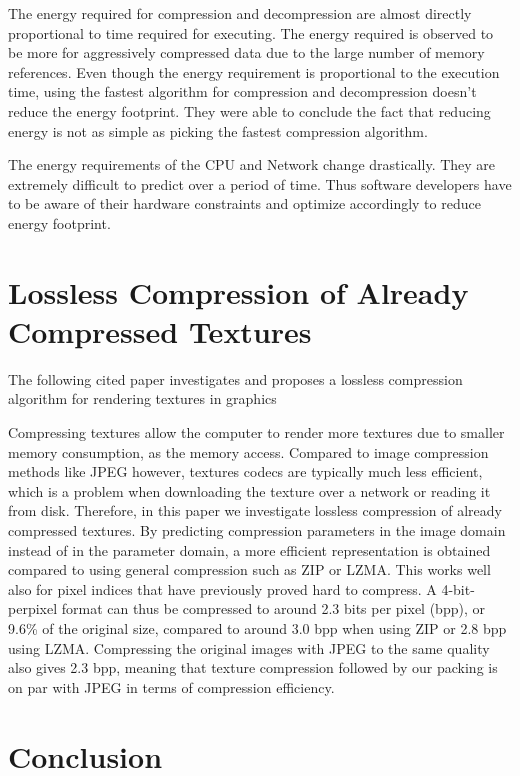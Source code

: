 \documentclass{article}
\begin{document}
The energy required for compression and decompression are almost directly proportional to time required for executing. The energy required is observed to be more for aggressively compressed data due to the large number of memory references. Even though the energy requirement is proportional to the execution time, using the fastest algorithm for compression and decompression doesn't reduce the energy footprint. They were able to conclude the fact that reducing energy is not as simple as picking the fastest compression algorithm.

The energy requirements of the CPU and Network change drastically. They are extremely difficult to predict over a period of time. Thus software developers have to be aware of their hardware constraints and optimize accordingly to reduce energy footprint. 

\section{Lossless Compression of Already Compressed Textures \cite{strom2011lossless}}

The following cited paper investigates and proposes a lossless compression algorithm for rendering textures in graphics

Compressing textures allow the computer to render more textures due to smaller memory consumption, as the memory access. Compared to image compression methods like JPEG however, textures codecs are typically much less efficient, which is a problem when downloading the texture over a network or reading it from disk. Therefore, in this paper we investigate lossless compression of already compressed textures. By predicting compression parameters in the image domain instead of in the parameter domain, a more efficient representation is obtained compared to using general compression such as ZIP or LZMA. This works well also for pixel indices that have previously proved hard to compress. A 4-bit-perpixel format can thus be compressed to around 2.3 bits per pixel (bpp), or 9.6\% of the original size, compared to around 3.0 bpp when using ZIP or 2.8 bpp using LZMA. Compressing the original
images with JPEG to the same quality also gives 2.3 bpp, meaning that texture compression followed by our packing is on par with JPEG in terms of compression efficiency.


\section{Conclusion}
\end{document}

